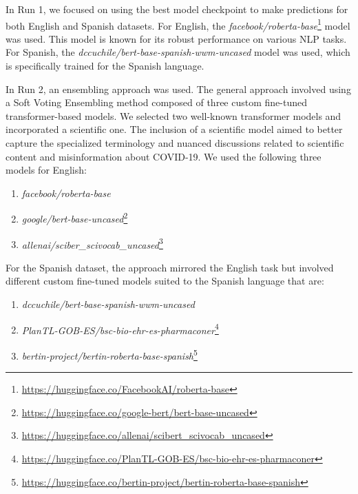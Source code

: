 \documentclass{Configuration_Files/PoliMi3i_thesis}
\begin{document}
In Run 1, we focused on using the best model checkpoint to make predictions for both English and Spanish datasets. For English, the \textit{facebook/roberta-base}\footnote{\url{https://huggingface.co/FacebookAI/roberta-base}} \cite{Liu2019RoBERTaAR} model was used. This model is known for its robust performance on various NLP tasks. For Spanish, the \textit{dccuchile/bert-base-spanish-wwm-uncased} model was used, which is specifically trained for the Spanish language. 

In Run 2, an ensembling approach was used. 
The general approach involved using a Soft Voting Ensembling method composed of three custom fine-tuned transformer-based models. We selected two well-known transformer models and incorporated a scientific one. The inclusion of a scientific model aimed to better capture the specialized terminology and nuanced discussions related to scientific content and misinformation about COVID-19. We used the following three models for English:
\begin{enumerate}
    \item \textit{facebook/roberta-base}\cite{Liu2019RoBERTaAR}%
    \item \textit{google/bert-base-uncased}\footnote{\url{https://huggingface.co/google-bert/bert-base-uncased}} 
    \cite{devlin-etal-2019-bert}
    \item \textit{allenai/sciber\_scivocab\_uncased}\footnote{\url{https://huggingface.co/allenai/scibert_scivocab_uncased}} \cite{beltagy-etal-2019-scibert}
\end{enumerate}

For the Spanish dataset, the approach mirrored the English task but involved different custom fine-tuned models suited to the Spanish language that are:
\begin{enumerate}
    \item \textit{dccuchile/bert-base-spanish-wwm-uncased}\cite{CaneteCFP2020}%
    \item \textit{PlanTL-GOB-ES/bsc-bio-ehr-es-pharmaconer}\footnote{\url{https://huggingface.co/PlanTL-GOB-ES/bsc-bio-ehr-es-pharmaconer}} \cite{carrino2022pretrained}
    \item \textit{bertin-project/bertin-roberta-base-spanish}\footnote{\url{https://huggingface.co/bertin-project/bertin-roberta-base-spanish}} \cite{BERTIN}
\end{enumerate}
\end{document}
